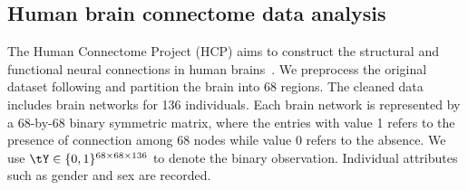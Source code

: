 \documentclass[lettersize,onecolumn,journal]{IEEEtran}
\theoremstyle{definition}
\theoremstyle{definition}
\begin{document}



\subsection{Human brain connectome data analysis}

The Human Connectome Project (HCP) aims to construct the structural and functional neural connections in human brains~\citep{van2013wu}. We preprocess the original dataset following \cite{desikan2006automated} and partition the brain into 68 regions. The cleaned data includes brain networks for 136 individuals. Each brain network is represented by a 68-by-68 binary symmetric matrix, where the entries with value 1 refers to the presence of connection among 68 nodes while value 0 refers to the absence. We use $\tY \in \{0,1\}^{68 \times 68 \times 136}$ to denote the binary observation. Individual attributes such as gender and sex are recorded.
\end{document}
